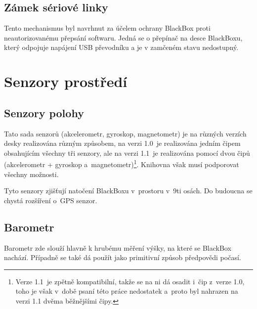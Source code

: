 \subsection{Zámek sériové linky}
Tento mechanismus byl navrhnut za účelem ochrany BlackBox proti neautorizovanému přepsání softwaru.
Jedná se o přepínač na desce BlackBoxu, který odpojuje napájení USB převodníku a je v zamčeném stavu nedostupný.

\section{Senzory prostředí}

\subsection{Senzory polohy}
Tato sada senzorů (akcelerometr, gyroskop, magnetometr) je na různých verzích desky realizována různým způsobem, na verzi 1.0~je realizována jedním čipem obsahujícím všechny tři senzory, ale na verzi 1.1~je realizována pomocí dvou čipů (akcelerometr + gyroskop a~magnetometr)\footnote{Verze 1.1~je zpětně kompatibilní, takže se na ni dá osadit i~čip z~verze 1.0, toho je však v~době psaní této práce nedostatek a~proto byl nahrazen na verzi 1.1 dvěma běžnějšími čipy.}.
Knihovna však musí podporovat všechny možnosti.

Tyto senzory zjišťují natočení BlackBoxu v~prostoru v~9ti osách.
Do budoucna se chystá rozšíření o~GPS senzor.

\subsection{Barometr}
Barometr zde slouží hlavně k hrubému měření výšky, na které se BlackBox nachází.
Případně se také dá použít jako primitivní způsob předpovědi počasí.